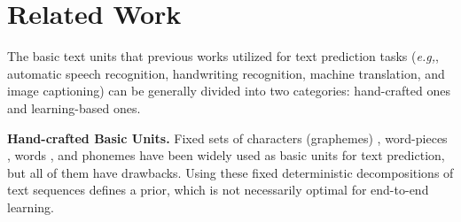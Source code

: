 \documentclass{article}
\def\eg{{\it e.g,}}
\begin{document}


\vspace{-2pt}
\section{Related Work}
\vspace{-4pt}
The basic text units that previous works utilized for text prediction tasks (\eg, automatic speech recognition, handwriting recognition, machine translation, and image captioning) can be generally divided into two categories: hand-crafted ones and learning-based ones.

\textbf{Hand-crafted Basic Units.}
Fixed sets of characters (graphemes) \cite{graves2006connectionist, amodei2015deep}, word-pieces \cite{wu2016google, collobert2016wav2letter, zweig2016advances}, words \cite{soltau2016neural, cho2015using}, and phonemes \cite{lee1988large, sercu2016dense, xiong2016achieving} have been widely used as basic units for text prediction, but all of them have drawbacks. Using these fixed deterministic decompositions of text sequences defines a prior, which is not necessarily optimal for end-to-end learning.
\end{document}
